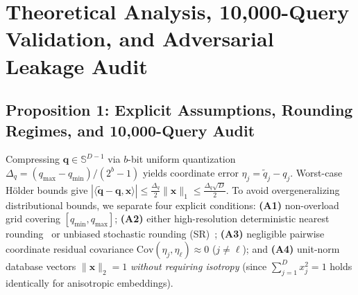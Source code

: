 \documentclass[10pt,journal,compsoc]{IEEEtran}
\begin{document}
\section{Theoretical Analysis, 10,000-Query Validation, and Adversarial Leakage Audit}\label{sec:theory}
\subsection{Proposition 1: Explicit Assumptions, Rounding Regimes, and 10,000-Query Audit}
Compressing $\mathbf{q} \in \mathbb{S}^{D-1}$ via $b$-bit uniform quantization $\Delta_q = (q_{\max}-q_{\min})/(2^b-1)$ yields coordinate error $\eta_j = \tilde{q}_j - q_j$. Worst-case Hölder bounds give $|\langle \tilde{\mathbf{q}}-\mathbf{q},\mathbf{x}\rangle| \le \frac{\Delta_q}{2}\|\mathbf{x}\|_1 \le \frac{\Delta_q\sqrt{D}}{2}$. To avoid overgeneralizing distributional bounds, we separate four explicit conditions: \textbf{(A1)} non-overload grid covering $[q_{\min},q_{\max}]$; \textbf{(A2)} either high-resolution deterministic nearest rounding~\cite{gray1998quantization} or unbiased stochastic rounding (SR)~\cite{gupta2015stochastic}; \textbf{(A3)} negligible pairwise coordinate residual covariance $\mathrm{Cov}(\eta_j,\eta_\ell)\approx 0$ ($j\ne \ell$); and \textbf{(A4)} unit-norm database vectors $\|\mathbf{x}\|_2 = 1$ \emph{without requiring isotropy} (since $\sum_{j=1}^D x_j^2 = 1$ holds identically for anisotropic embeddings).
\end{document}
